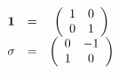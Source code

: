\begin{equation}\label{1sig}
\begin{array} {ccc}
   {\bf 1} & = & \left( \begin{array}{cc}
                           1  & 0 \\
                           0  & 1
                        \end{array}
                  \right) \\
   {\bf \sigma} & = & \left ( \begin{array}{cc}
                           0  & -1 \\
                           1  &  0
                         \end{array}
                  \right)
\end{array}
\end{equation}

